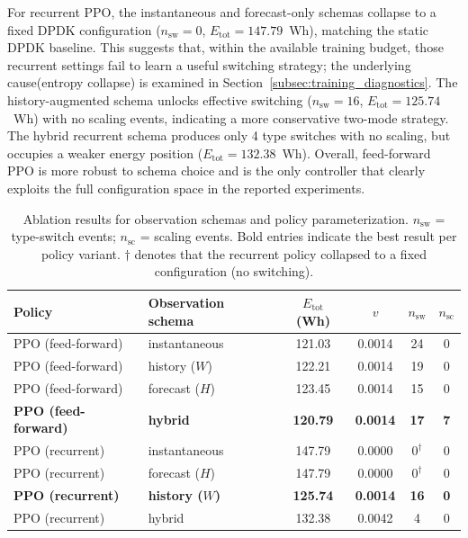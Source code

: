 \documentclass[a4paper,fleqn]{cas-sc}
\begin{document}
For recurrent PPO, the instantaneous and forecast-only schemas collapse to a fixed DPDK configuration ($n_{\mathrm{sw}}=0$, $E_{\mathrm{tot}}=147.79$~Wh), matching the static DPDK baseline. This suggests that, within the available training budget, those recurrent settings fail to learn a useful switching strategy; the underlying cause(entropy collapse) is examined in Section~\ref{subsec:training_diagnostics}. The history-augmented schema unlocks effective switching ($n_{\mathrm{sw}}=16$, $E_{\mathrm{tot}}=125.74$~Wh) with no scaling events, indicating a more conservative two-mode strategy. The hybrid recurrent schema produces only 4 type switches with no scaling, but occupies a weaker energy position ($E_{\mathrm{tot}}=132.38$~Wh). Overall, feed-forward PPO is more robust to schema choice and is the only controller that clearly exploits the full configuration space in the reported experiments.

\begin{table}[width=.9\linewidth,cols=6,pos=h]
\centering
\caption{Ablation results for observation schemas and policy parameterization. $n_{\mathrm{sw}}$ = type-switch events; $n_{\mathrm{sc}}$ = scaling events. Bold entries indicate the best result per policy variant. $\dagger$ denotes that the recurrent policy collapsed to a fixed configuration (no switching).}
\label{tab:ablation_obs}
\begin{tabular}{l l c c c c}
\hline
Policy & Observation schema & $E_{\mathrm{tot}}$ (Wh) & $v$ & $n_{\mathrm{sw}}$ & $n_{\mathrm{sc}}$ \\
\hline
PPO (feed-forward) & instantaneous    & 121.03 & 0.0014 & 24 & 0 \\
PPO (feed-forward) & history ($W$)    & 122.21 & 0.0014 & 19 & 0 \\
PPO (feed-forward) & forecast ($H$)   & 123.45 & 0.0014 & 15 & 0 \\
\textbf{PPO (feed-forward)} & \textbf{hybrid} & \textbf{120.79} & \textbf{0.0014} & \textbf{17} & \textbf{7} \\
\hline
PPO (recurrent) & instantaneous       & 147.79 & 0.0000 & $0^\dagger$ & 0 \\
PPO (recurrent) & forecast ($H$)      & 147.79 & 0.0000 & $0^\dagger$ & 0 \\
\textbf{PPO (recurrent)} & \textbf{history ($W$)} & \textbf{125.74} & \textbf{0.0014} & \textbf{16} & \textbf{0} \\
PPO (recurrent) & hybrid              & 132.38 & 0.0042 & 4 & 0 \\
\hline
\end{tabular}
\end{table}
\end{document}
